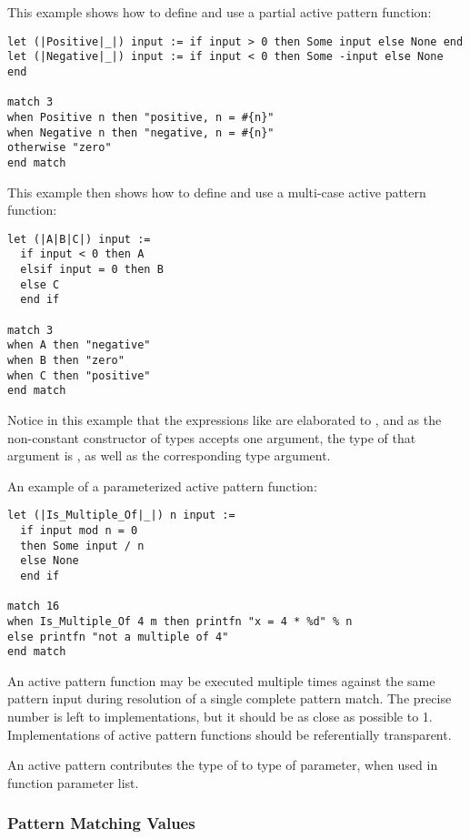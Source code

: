 \example This example shows how to define and use a partial active pattern function:
\begin{lstlisting}
let (|Positive|_|) input := if input > 0 then Some input else None end
let (|Negative|_|) input := if input < 0 then Some -input else None end

match 3
when Positive n then "positive, n = #{n}"
when Negative n then "negative, n = #{n}"
otherwise "zero"
end match
\end{lstlisting}

\example This example then shows how to define and use a multi-case active pattern function:
\begin{lstlisting}
let (|A|B|C|) input := 
  if input < 0 then A
  elsif input = 0 then B
  else C
  end if
  
match 3
when A then "negative"
when B then "zero"
when C then "positive"
end match
\end{lstlisting}
Notice in this example that the expressions like  are elaborated to , and as the non-constant constructor of  types accepts one argument, the type of that argument is , as well as the corresponding type argument. 

\example An example of a parameterized active pattern function:
\begin{lstlisting}[deletekeywords={not,of}]
let (|Is_Multiple_Of|_|) n input := 
  if input mod n = 0
  then Some input / n
  else None
  end if
  
match 16
when Is_Multiple_Of 4 m then printfn "x = 4 * %d" % n
else printfn "not a multiple of 4"
end match
\end{lstlisting}

An active pattern function may be executed multiple times against the same pattern input during resolution of a single complete pattern match. The precise number is left to implementations, but it should be as close as possible to 1. Implementations of active pattern functions should be referentially transparent. 

An active pattern contributes the type of  to type of parameter, when used in function parameter list. 





\subsubsection{Pattern Matching Values}
\label{sec:pattern-matching-values}

